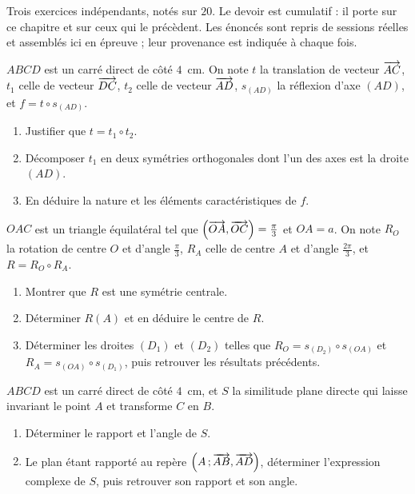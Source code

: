 \begin{devoir}[2 heures]
Trois exercices indépendants, notés sur $20$. Le devoir est cumulatif : il porte sur ce chapitre et sur ceux qui le précèdent. Les énoncés sont repris de sessions réelles et assemblés ici en épreuve ; leur provenance est indiquée à chaque fois.

$ABCD$ est un carré direct de côté $4$~cm. On note $t$ la translation de
vecteur $\overrightarrow{AC}$, $t_{1}$ celle de vecteur $\overrightarrow{DC}$, $t_{2}$ celle de
vecteur $\overrightarrow{AD}$, $s_{(AD)}$ la réflexion d'axe $(AD)$, et
$f = t \circ s_{(AD)}$.
\begin{enumerate}[label=\textbf{\alph*)}, leftmargin=*, itemsep=0.15em]
  \item Justifier que $t = t_{1} \circ t_{2}$.
  \item Décomposer $t_{1}$ en deux symétries orthogonales dont l'un des axes
        est la droite $(AD)$.
  \item En déduire la nature et les éléments caractéristiques de $f$.
\end{enumerate}

$OAC$ est un triangle équilatéral tel que
$\left(\overrightarrow{OA},\overrightarrow{OC}\right) = \frac{\pi}{3}$ et $OA = a$. On note
$R_{O}$ la rotation de centre $O$ et d'angle $\frac{\pi}{3}$, $R_{A}$ celle de
centre $A$ et d'angle $\frac{2\pi}{3}$, et $R = R_{O} \circ R_{A}$.
\begin{enumerate}[label=\textbf{\alph*)}, leftmargin=*, itemsep=0.15em]
  \item Montrer que $R$ est une symétrie centrale.
  \item Déterminer $R(A)$ et en déduire le centre de $R$.
  \item Déterminer les droites $(D_{1})$ et $(D_{2})$ telles que
        $R_{O} = s_{(D_{2})} \circ s_{(OA)}$ et
        $R_{A} = s_{(OA)} \circ s_{(D_{1})}$, puis retrouver les résultats
        précédents.
\end{enumerate}

$ABCD$ est un carré direct de côté $4$~cm, et $S$ la similitude plane directe
qui laisse invariant le point $A$ et transforme $C$ en $B$.
\begin{enumerate}[label=\textbf{\alph*)}, leftmargin=*, itemsep=0.15em]
  \item Déterminer le rapport et l'angle de $S$.
  \item Le plan étant rapporté au repère
        $\left(A\,;\overrightarrow{AB},\overrightarrow{AD}\right)$, déterminer l'expression
        complexe de $S$, puis retrouver son rapport et son angle.
\end{enumerate}

\end{devoir}

